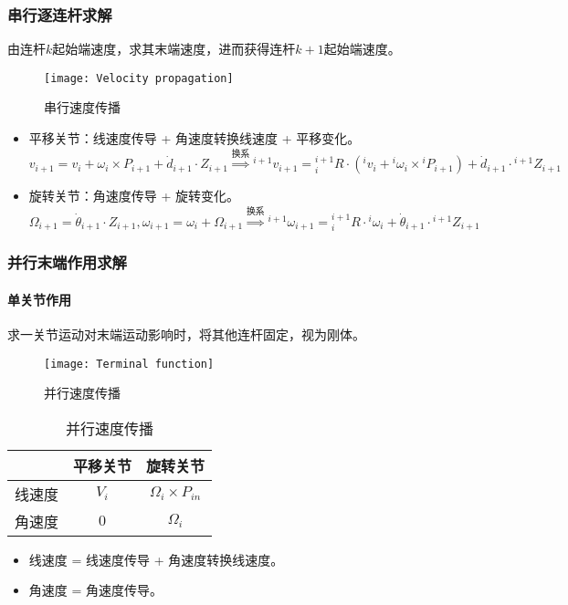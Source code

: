 \documentclass[
12pt, %
a4paper, 
oneside, %
headinclude,footinclude, %
]{scrartcl}
\begin{document}
\subsubsection[串行逐连杆求解]{串行逐连杆求解}
由连杆$ k $起始端速度，求其末端速度，进而获得连杆$ k + 1 $起始端速度。

\begin{figure}[H]
\centering 
\texttt{[image: Velocity propagation]} 
\caption{串行速度传播}
\end{figure}

\begin{itemize}
\item 平移关节：线速度传导 + 角速度转换线速度 + 平移变化。
$$
v_{i + 1} = v_i + \omega_i \times P_{i + 1} + \dot{d}_{i + 1} \cdot Z_{i + 1}
\overset{\text{换系}}{\Longrightarrow}
{}^{i + 1}v_{i + 1} = {}^{i + 1}_i R \cdot ({}^i v_i + {}^i \omega_i \times {}^i P_{i + 1}) + \dot{d}_{i + 1} \cdot {}^{i + 1}Z_{i + 1}
$$
\item 旋转关节：角速度传导 + 旋转变化。
$$
\Omega_{i + 1} = \dot{\theta}_{i + 1} \cdot Z_{i + 1}, \omega_{i + 1} = \omega_i + \Omega_{i + 1}
\overset{\text{换系}}{\Longrightarrow}
{}^{i + 1}\omega_{i + 1} = {}^{i + 1}_i R \cdot {}^i \omega_i + \dot{\theta}_{i + 1} \cdot {}^{i + 1}Z_{i + 1}
$$
\end{itemize} 
\subsubsection[并行末端作用求解]{并行末端作用求解}
\paragraph{单关节作用}\label{sec:bingxing}
求一关节运动对末端运动影响时，将其他连杆固定，视为刚体。 \\
\noindent
\begin{minipage}{0.6\textwidth}
\begin{figure}[H]
\centering 
\texttt{[image: Terminal function]} 
\caption{并行速度传播}
\end{figure}
\end{minipage}
\begin{minipage}{0.4\textwidth}
\begin{table}[H]
\centering
\begin{tabular}{c|cc}
\hline
& 平移关节 & 旋转关节 \\
\hline
线速度 & $ V_i $ & $ \Omega_i \times P_{in} $ \\
角速度 & $ 0 $ & $ \Omega_i $ \\
\hline
\end{tabular}
\caption{并行速度传播}
\end{table}
\end{minipage}
\begin{itemize}
\item 线速度 = 线速度传导 + 角速度转换线速度。
\item 角速度 = 角速度传导。
\end{itemize} 
\end{document}
